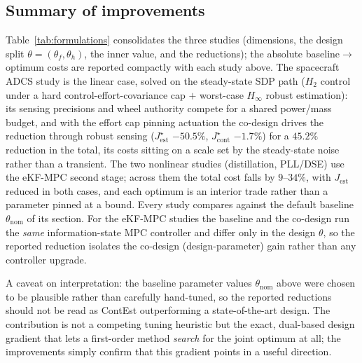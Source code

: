 \documentclass[twocolumn,amsthm]{autart}
\begin{document}
\subsection{Summary of improvements}
\label{sec:sim:summary}

Table~\ref{tab:formulations} consolidates the three studies (dimensions, the design
split $\theta=(\theta_f,\theta_h)$, the inner value, and
the reductions); the absolute baseline$\to$optimum costs are reported compactly with
each study above. The spacecraft ADCS study is the linear case, solved on
the steady-state SDP path ($H_2$ control under a hard control-effort-covariance cap
$+$ worst-case $H_\infty$ robust estimation): its sensing precisions and wheel
authority compete for a shared power/mass budget, and with the effort cap pinning
actuation the co-design drives the reduction through robust sensing
($J_{\mathrm{est}}^\star$ $-50.5\%$, $J_{\mathrm{cont}}^\star$ $-1.7\%$) for a
$45.2\%$ reduction in the total, its costs
sitting on a scale set by the steady-state noise rather than a transient. The two
nonlinear studies (distillation, PLL/DSE) use the eKF-MPC second stage; across them
the total cost falls by $9$--$34\%$, with $J_{\mathrm{est}}$ reduced in both cases,
and each optimum is an interior trade rather than a parameter pinned at a bound.
Every study compares against the default baseline $\theta_{\mathrm{nom}}$ of its
section. For the eKF-MPC studies the baseline and the co-design run the \emph{same}
information-state MPC controller and differ only in the design $\theta$, so the
reported reduction isolates the co-design (design-parameter) gain rather than any
controller upgrade.

A caveat on interpretation: the baseline parameter values $\theta_{\mathrm{nom}}$
above were chosen to be plausible rather than carefully hand-tuned, so the
reported reductions should not be read as ContEst outperforming a state-of-the-art
design. The contribution is not a competing tuning heuristic but the exact,
dual-based design gradient that lets a first-order method \emph{search} for the
joint optimum at all; the improvements simply confirm that this gradient points
in a useful direction.
\end{document}
